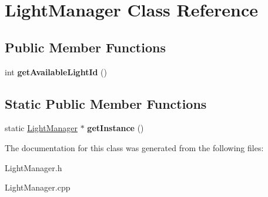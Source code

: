 \hypertarget{class_light_manager}{
\section{LightManager Class Reference}
\label{class_light_manager}
}
\subsection*{Public Member Functions}
\begin{DoxyCompactItemize}
\item 
\hypertarget{class_light_manager_a0e9df103ca3061304962a734c63a3749}{
int {\bfseries getAvailableLightId} ()}
\label{class_light_manager_a0e9df103ca3061304962a734c63a3749}

\end{DoxyCompactItemize}
\subsection*{Static Public Member Functions}
\begin{DoxyCompactItemize}
\item 
\hypertarget{class_light_manager_a173a4cfc7bc844e10a02be0d4dab00c9}{
static \hyperlink{class_light_manager}{LightManager} $\ast$ {\bfseries getInstance} ()}
\label{class_light_manager_a173a4cfc7bc844e10a02be0d4dab00c9}

\end{DoxyCompactItemize}


The documentation for this class was generated from the following files:\begin{DoxyCompactItemize}
\item 
LightManager.h\item 
LightManager.cpp\end{DoxyCompactItemize}
